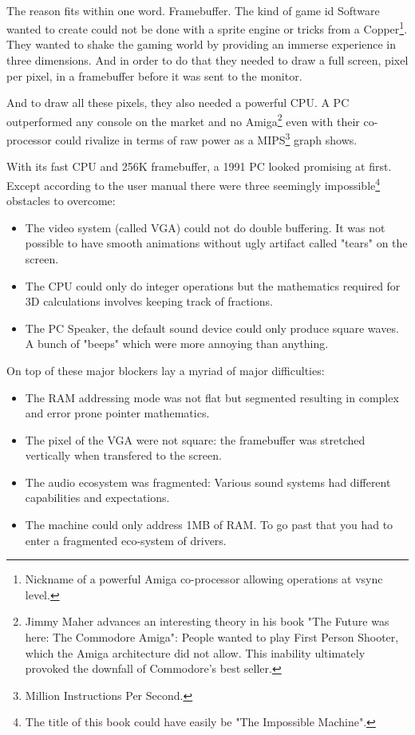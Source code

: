 \\
The reason fits within one word. Framebuffer. The kind of game id Software wanted to create could not be done with a sprite engine or tricks from a Copper\footnote{Nickname of a powerful Amiga co-processor allowing operations at vsync level.}. They wanted to shake the gaming world by providing an immerse experience in three dimensions. And in order to do that they needed to draw a full screen, pixel per pixel, in a framebuffer before it was sent to the monitor. \\
\par
And to draw all these pixels, they also needed a powerful CPU. A PC outperformed any console on the market and no Amiga\footnote{Jimmy Maher advances an interesting theory in his book "The Future was here: The Commodore Amiga": People wanted to play First Person Shooter, which the Amiga architecture did not allow. This inability ultimately provoked the downfall of Commodore's best seller.} even with their co-processor could rivalize in terms of raw power as a MIPS\footnote{Million Instructions Per Second.} graph shows.
\par


 
With its fast CPU and 256K framebuffer, a 1991 PC looked promising at first. Except according to the user manual there were three seemingly impossible\footnote{The title of this book could have easily be "The Impossible Machine".} obstacles to overcome:\\
\begin{itemize}
\item The video system (called VGA) could not do double buffering. It was not possible to have smooth animations without ugly artifact called "tears" on the screen.
\item The CPU could only do integer operations but the mathematics required for 3D calculations involves keeping track of fractions.
\item The PC Speaker, the default sound device could only produce square waves. A bunch of "beeps" which were more annoying than anything.
\end{itemize}
On top of these major blockers lay a myriad of major difficulties:\\
\begin{itemize}
\item The RAM addressing mode was not flat but segmented resulting in complex and error prone pointer mathematics.
\item The pixel of the VGA were not square: the framebuffer was stretched vertically when
transfered to the screen.
\item The audio ecosystem was fragmented: Various sound systems had different capabilities and expectations.
\item The machine could only address 1MB of RAM. To go past that you had to enter a fragmented eco-system of drivers.
\end{itemize}

